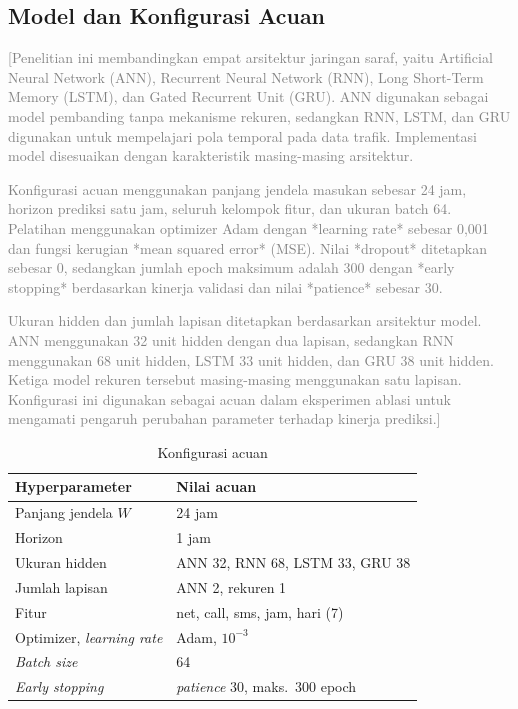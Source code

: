 \documentclass[conference,a4paper]{IEEEtran}
\newcommand{\petunjuk}[1]{\textcolor{gray}{[#1]}}
\begin{document}
\subsection{Model dan Konfigurasi Acuan}
\petunjuk{Penelitian ini membandingkan empat arsitektur jaringan saraf, yaitu Artificial Neural Network (ANN), Recurrent Neural Network (RNN), Long Short-Term Memory (LSTM), dan Gated Recurrent Unit (GRU). ANN digunakan sebagai model pembanding tanpa mekanisme rekuren, sedangkan RNN, LSTM, dan GRU digunakan untuk mempelajari pola temporal pada data trafik. Implementasi model disesuaikan dengan karakteristik masing-masing arsitektur.

Konfigurasi acuan menggunakan panjang jendela masukan sebesar 24 jam, horizon prediksi satu jam, seluruh kelompok fitur, dan ukuran batch 64. Pelatihan menggunakan optimizer Adam dengan *learning rate* sebesar 0,001 dan fungsi kerugian *mean squared error* (MSE). Nilai *dropout* ditetapkan sebesar 0, sedangkan jumlah epoch maksimum adalah 300 dengan *early stopping* berdasarkan kinerja validasi dan nilai *patience* sebesar 30.

Ukuran hidden dan jumlah lapisan ditetapkan berdasarkan arsitektur model. ANN menggunakan 32 unit hidden dengan dua lapisan, sedangkan RNN menggunakan 68 unit hidden, LSTM 33 unit hidden, dan GRU 38 unit hidden. Ketiga model rekuren tersebut masing-masing menggunakan satu lapisan. Konfigurasi ini digunakan sebagai acuan dalam eksperimen ablasi untuk mengamati pengaruh perubahan parameter terhadap kinerja prediksi.}

\begin{table}[t]
  \centering
  \caption{Konfigurasi acuan}
  \label{tab:acuan}
  \begin{tabular}{@{}ll@{}}
    \toprule
    Hyperparameter & Nilai acuan \\
    \midrule
    Panjang jendela $W$ & 24 jam \\
    Horizon & 1 jam \\
    Ukuran hidden & ANN 32, RNN 68, LSTM 33, GRU 38 \\
    Jumlah lapisan & ANN 2, rekuren 1 \\
    Fitur & net, call, sms, jam, hari (7) \\
    Optimizer, \textit{learning rate} & Adam, $10^{-3}$ \\
    \textit{Batch size} & 64 \\
    \textit{Early stopping} & \textit{patience} 30, maks.\ 300 epoch \\
    \bottomrule
  \end{tabular}
\end{table}
\end{document}
